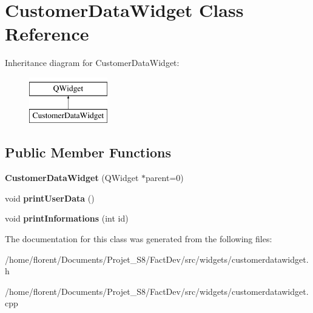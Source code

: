 \hypertarget{classCustomerDataWidget}{\section{Customer\-Data\-Widget Class Reference}
\label{classCustomerDataWidget}
}
Inheritance diagram for Customer\-Data\-Widget\-:\begin{figure}[H]
\begin{center}
\leavevmode
\includegraphics[height=2.000000cm]{df/df4/classCustomerDataWidget}
\end{center}
\end{figure}
\subsection*{Public Member Functions}
\begin{DoxyCompactItemize}
\item 
\hypertarget{classCustomerDataWidget_ae629d9d3839bd9f067927b19e1bb85cd}{{\bfseries Customer\-Data\-Widget} (Q\-Widget $\ast$parent=0)}\label{classCustomerDataWidget_ae629d9d3839bd9f067927b19e1bb85cd}

\item 
\hypertarget{classCustomerDataWidget_a9a56bd1d7faf76d083cfa97f2883bdf1}{void {\bfseries print\-User\-Data} ()}\label{classCustomerDataWidget_a9a56bd1d7faf76d083cfa97f2883bdf1}

\item 
\hypertarget{classCustomerDataWidget_ab61052cc337e51d1e34149d67816c58f}{void {\bfseries print\-Informations} (int id)}\label{classCustomerDataWidget_ab61052cc337e51d1e34149d67816c58f}

\end{DoxyCompactItemize}


The documentation for this class was generated from the following files\-:\begin{DoxyCompactItemize}
\item 
/home/florent/\-Documents/\-Projet\-\_\-\-S8/\-Fact\-Dev/src/widgets/customerdatawidget.\-h\item 
/home/florent/\-Documents/\-Projet\-\_\-\-S8/\-Fact\-Dev/src/widgets/customerdatawidget.\-cpp\end{DoxyCompactItemize}
